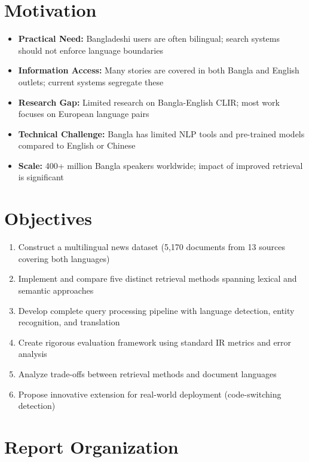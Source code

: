\documentclass[12pt,a4paper]{report}
\begin{document}
\section{Motivation}

\begin{itemize}
    \item \textbf{Practical Need:} Bangladeshi users are often bilingual; search systems should not enforce language boundaries
    \item \textbf{Information Access:} Many stories are covered in both Bangla and English outlets; current systems segregate these
    \item \textbf{Research Gap:} Limited research on Bangla-English CLIR; most work focuses on European language pairs
    \item \textbf{Technical Challenge:} Bangla has limited NLP tools and pre-trained models compared to English or Chinese
    \item \textbf{Scale:} 400+ million Bangla speakers worldwide; impact of improved retrieval is significant
\end{itemize}

\section{Objectives}

\begin{enumerate}
    \item Construct a multilingual news dataset (5,170 documents from 13 sources covering both languages)
    \item Implement and compare five distinct retrieval methods spanning lexical and semantic approaches
    \item Develop complete query processing pipeline with language detection, entity recognition, and translation
    \item Create rigorous evaluation framework using standard IR metrics and error analysis
    \item Analyze trade-offs between retrieval methods and document languages
    \item Propose innovative extension for real-world deployment (code-switching detection)
\end{enumerate}

\section{Report Organization}
\end{document}
